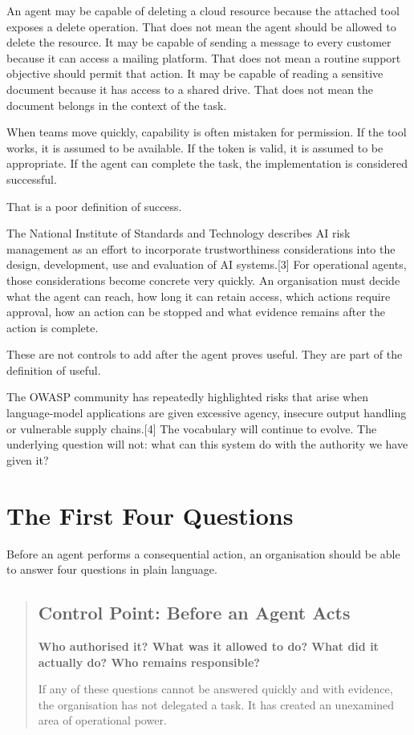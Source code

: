 An agent may be capable of deleting a cloud resource because the
attached tool exposes a delete operation. That does not mean the agent
should be allowed to delete the resource. It may be capable of sending a
message to every customer because it can access a mailing platform. That
does not mean a routine support objective should permit that action. It
may be capable of reading a sensitive document because it has access to
a shared drive. That does not mean the document belongs in the context
of the task.

When teams move quickly, capability is often mistaken for permission. If
the tool works, it is assumed to be available. If the token is valid, it
is assumed to be appropriate. If the agent can complete the task, the
implementation is considered successful.

That is a poor definition of success.

The National Institute of Standards and Technology describes AI risk
management as an effort to incorporate trustworthiness considerations
into the design, development, use and evaluation of AI systems.{[}3{]}
For operational agents, those considerations become concrete very
quickly. An organisation must decide what the agent can reach, how long
it can retain access, which actions require approval, how an action can
be stopped and what evidence remains after the action is complete.

These are not controls to add after the agent proves useful. They are
part of the definition of useful.

The OWASP community has repeatedly highlighted risks that arise when
language-model applications are given excessive agency, insecure output
handling or vulnerable supply chains.{[}4{]} The vocabulary will
continue to evolve. The underlying question will not: what can this
system do with the authority we have given it?

\section{The First Four Questions}\label{the-first-four-questions}

Before an agent performs a consequential action, an organisation should
be able to answer four questions in plain language.

\begin{quote}
\subsection{Control Point: Before an Agent
Acts}\label{control-point-before-an-agent-acts}

\textbf{Who authorised it? What was it allowed to do? What did it
actually do? Who remains responsible?}

If any of these questions cannot be answered quickly and with evidence,
the organisation has not delegated a task. It has created an unexamined
area of operational power.
\end{quote}

